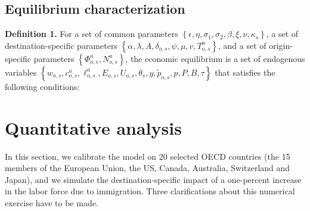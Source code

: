 \documentclass[a4paper,12pt]{article}
\begin{document}
\subsection{Equilibrium characterization} \label{equilibrium}
\begin{itshape}
\textbf{Definition 1.} For a set of common parameters $\left \{ \epsilon ,\eta ,\sigma _{1},\sigma _{2},\beta ,\xi ,\nu ,\kappa _{s}\right \} $, a set of destination-specific parameters $\left \{ \alpha ,\lambda ,A,\delta _{o,s},\psi ,\mu ,v,T_{o,s}^{a}\right \} $, and a set of origin-specific parameters $\left \{ \Phi _{o,s}^{a},N_{o,s}^{a}\right \} $, the economic equilibrium is a set of endogenous variables $\left\{ w_{o,s}, c_{o,s}^{a} ,\ell_{o,s}^{a}, E_{o,s},U_{o,s}, \theta_{s}, y, \widetilde{p}_{o,s}, p, P, B, \tau \right\}$ that satisfies the following 
conditions:

\end{itshape}

\section{Quantitative analysis} \label{quantitative_analysis}

In this section, we calibrate the model on 20 selected OECD countries (the 15 members of the European Union, the US, Canada, Australia, Switzerland and Japan), and we simulate the destination-specific impact of a one-percent increase in the labor force due to immigration. Three clarifications about this numerical exercise have to be made.
\end{document}
